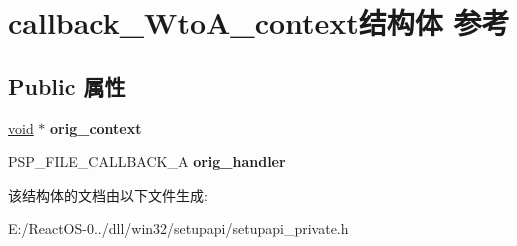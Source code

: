 \hypertarget{structcallback___wto_a__context}{}\section{callback\+\_\+\+Wto\+A\+\_\+context结构体 参考}
\label{structcallback___wto_a__context}
\subsection*{Public 属性}
\begin{DoxyCompactItemize}
\item 
\mbox{\label{structcallback___wto_a__context_a669af5f3950f2b481c6a46315527ab99}} 
\hyperlink{interfacevoid}{void} $\ast$ {\bfseries orig\+\_\+context}
\item 
\mbox{\label{structcallback___wto_a__context_a0550319fbdc175c44a1b76dbf52762b5}} 
P\+S\+P\+\_\+\+F\+I\+L\+E\+\_\+\+C\+A\+L\+L\+B\+A\+C\+K\+\_\+A {\bfseries orig\+\_\+handler}
\end{DoxyCompactItemize}


该结构体的文档由以下文件生成\+:\begin{DoxyCompactItemize}
\item 
E\+:/\+React\+O\+S-\/0../dll/win32/setupapi/setupapi\+\_\+private.\+h\end{DoxyCompactItemize}
